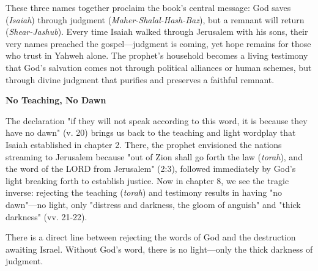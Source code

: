 \documentclass[11pt]{article}
\begin{document}
\vspace{1em}

\vspace{1em}

\vspace{1em}
These three names together proclaim the book's central message: God saves (\textit{Isaiah}) through judgment (\textit{Maher-Shalal-Hash-Baz}), but a remnant will return (\textit{Shear-Jashub}). Every time Isaiah walked through Jerusalem with his sons, their very names preached the gospel—judgment is coming, yet hope remains for those who trust in Yahweh alone. The prophet's household becomes a living testimony that God's salvation comes not through political alliances or human schemes, but through divine judgment that purifies and preserves a faithful remnant.

\vspace{3em}
{\large\bfseries No Teaching, No Dawn}
\vspace{1em}

The declaration "if they will not speak according to this word, it is because they have no dawn" (v. 20) brings us back to the teaching and light wordplay that Isaiah established in chapter 2. There, the prophet envisioned the nations streaming to Jerusalem because "out of Zion shall go forth the law (\textit{torah}), and the word of the LORD from Jerusalem" (2:3), followed immediately by God's light breaking forth to establish justice. Now in chapter 8, we see the tragic inverse: rejecting the teaching (\textit{torah}) and testimony results in having "no dawn"—no light, only "distress and darkness, the gloom of anguish" and "thick darkness" (vv. 21-22).

\vspace{1em}
There is a direct line between rejecting the words of God and the destruction awaiting Israel. Without God's word, there is no light—only the thick darkness of judgment.
\end{document}
